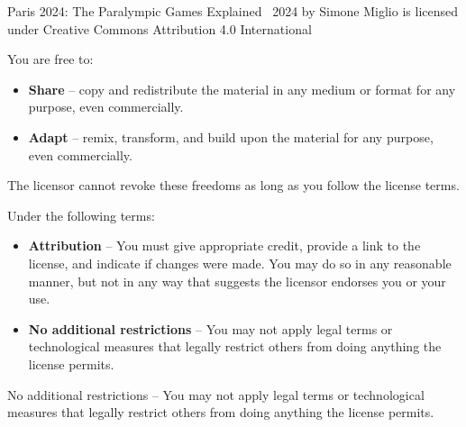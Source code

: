 \begin{center}
    \vspace*{\fill} 

    Paris 2024: The Paralympic Games Explained \textcopyright\ 2024 by Simone Miglio is licensed under Creative Commons Attribution 4.0 International

    \medskip

    You are free to:

    \begin{itemize}
        \item \textbf{Share} -- copy and redistribute the material in any medium or format for any purpose, even commercially.
        \item \textbf{Adapt} -- remix, transform, and build upon the material for any purpose, even commercially.
    \end{itemize}

    \medskip

    The licensor cannot revoke these freedoms as long as you follow the license terms.

    \medskip

    Under the following terms:

    \begin{itemize}
        \item \textbf{Attribution} -- You must give appropriate credit, provide a link to the license, and indicate if changes were made. You may do so in any reasonable manner, but not in any way that suggests the licensor endorses you or your use.
        \item \textbf{No additional restrictions} -- You may not apply legal terms or technological measures that legally restrict others from doing anything the license permits.
    \end{itemize}

    \medskip

    No additional restrictions -- You may not apply legal terms or technological measures that legally restrict others from doing anything the license permits.

    \vspace*{\fill} 
\end{center}